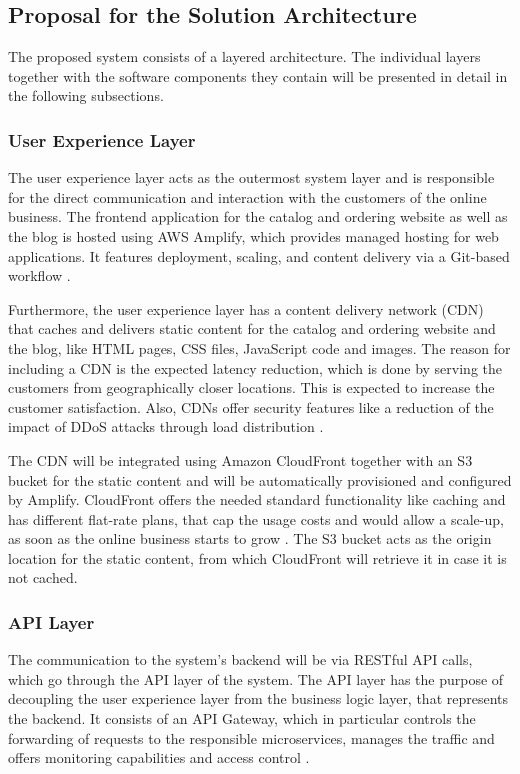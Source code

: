 \documentclass[12pt,a4paper]{article}
\begin{document}
\subsection{Proposal for the Solution Architecture}

The proposed system consists of a layered architecture. The individual layers together with the software components they contain will be presented in detail in the following subsections.

\subsubsection{User Experience Layer}

The user experience layer acts as the outermost system layer and is responsible for the direct communication and interaction with the customers of the online business. The frontend application for the catalog and ordering website as well as the blog is hosted using AWS Amplify, which provides managed hosting for web applications. It features deployment, scaling, and content delivery via a Git-based workflow \cite{aws_amplify_docs}.

Furthermore, the user experience layer has a content delivery network (CDN) that caches and delivers static content for the catalog and ordering website and the blog, like HTML pages, CSS files, JavaScript code and images. The reason for including a CDN is the expected latency reduction, which is done by serving the customers from geographically closer locations. This is expected to increase the customer satisfaction. Also, CDNs offer security features like a reduction of the impact of DDoS attacks through load distribution \cite{microsoft_cdns}.

The CDN will be integrated using Amazon CloudFront together with an S3 bucket for the static content and will be automatically provisioned and configured by Amplify. CloudFront offers the needed standard functionality like caching and has different flat-rate plans, that cap the usage costs and would allow a scale-up, as soon as the online business starts to grow \cite{aws_cloudfront_overview}. The S3 bucket acts as the origin location for the static content, from which CloudFront will retrieve it in case it is not cached.

\subsubsection{API Layer}

The communication to the system's backend will be via RESTful API calls, which go through the API layer of the system. The API layer has the purpose of decoupling the user experience layer from the business logic layer, that represents the backend. It consists of an API Gateway, which in particular controls the forwarding of requests to the responsible microservices, manages the traffic and offers monitoring capabilities and access control \cite{aws_apigateway_overview}.
\end{document}
